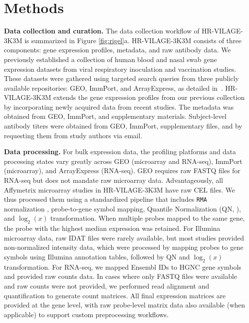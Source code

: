 \documentclass[
  12pt]{article}
\begin{document}
\section{Methods}

\noindent\textbf{Data collection and curation.}
The data collection workflow of HR-VILAGE-3K3M is summarized in Figure \ref{fig:rigel}a. HR-VILAGE-3K3M consists of three components: gene expression profiles, metadata, and raw antibody data. We previously established a collection of human blood and nasal swab gene expression datasets from viral respiratory inoculation and vaccination studies. These datasets were gathered using targeted search queries from three publicly available repositories: GEO, ImmPort, and ArrayExpress, as detailed in~\citep{lan2024curated}. HR-VILAGE-3K3M extends the gene expression profiles from our previous collection by incorporating newly acquired data from recent studies. The metadata was obtained from GEO, ImmPort, and supplementary materials. Subject-level antibody titers were obtained from GEO, ImmPort, supplementary files, and by requesting them from study authors via email. 

\noindent\textbf{Data processing.}
For bulk expression data, the profiling platforms and data processing states vary greatly across GEO (microarray and RNA-seq), ImmPort (microarray), and ArrayExpress (RNA-seq). GEO requires raw FASTQ files for RNA-seq but does not mandate raw microarray data. Advantageously, all Affymetrix microarray studies in HR-VILAGE-3K3M have raw CEL files. We thus processed them using a standardized pipeline that includes \texttt{RMA}  normalization \citep{irizarry2003summaries}, probe-to-gene symbol mapping, Quantile Normalization (QN, \citep{bolstad2003comparison}), and $\log_2(x)$ transformation. When multiple probes mapped to the same gene, the probe with the highest median expression was retained. For Illumina microarray data, raw IDAT files were rarely available, but most studies provided non-normalized intensity data, which were processed by mapping probes to gene symbols using Illumina annotation tables, followed by QN and $\log_2(x)$ transformation. For RNA-seq, we mapped Ensembl IDs to HGNC gene symbols and provided raw counts data. In cases where only FASTQ files were available and raw counts were not provided, we performed read alignment and quantification to generate count matrices. All final expression matrices are provided at the gene level, with raw probe-level matrix data also available (when applicable) to support custom preprocessing workflows. 
\end{document}
